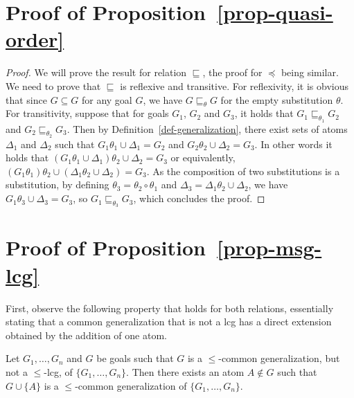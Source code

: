 
	\section{Proof of Proposition~\ref{prop-quasi-order}}
\begin{proof}
	We will prove the result for relation $\sqsubseteq$, the proof for $\preceq$ being similar. We need to prove that $\sqsubseteq$ is reflexive and transitive. For reflexivity, it is obvious that since $G\subseteq G$ for any goal $G$, we have $G\sqsubseteq_\theta G$ for the empty substitution $\theta$. For transitivity, suppose that for goals $G_1$, $G_2$ and $G_3$, it holds that $G_1 \sqsubseteq_{\theta_1} G_2$ and $G_2 \sqsubseteq_{\theta_2} G_3$. Then by Definition~\ref{def-generalization}, there exist sets of atoms $\Delta_1$ and $\Delta_2$ such that $G_1\theta_1 \cup \Delta_1 = G_2$ and $G_2\theta_2\cup\Delta_2 = G_3$. In other words it holds that $(G_1\theta_1\cup\Delta_1)\theta_2\cup\Delta_2 = G_3$ or equivalently, $(G_1\theta_1)\theta_2 \cup (\Delta_1\theta_2 \cup\Delta_2) = G_3$. As the composition of two substitutions is a substitution, by defining $\theta_3 = \theta_2\circ\theta_1$ and $\Delta_3 = \Delta_1\theta_2 \cup\Delta_2$, we have $G_1\theta_3 \cup \Delta_3 = G_3$, so $G_1\sqsubseteq_{\theta_3} G_3$, which concludes the proof.
\end{proof}
	

	\section{Proof of Proposition~\ref{prop-msg-lcg}}
	
		First, observe the following property that holds for both relations, essentially stating that a common generalization that is not a lcg has a direct extension obtained by the addition of one atom. 
		
		\begin{proposition}\label{prop-lcg-extensible}
			Let $G_1, \dots, G_n$ and $G$ be goals such that $G$ is a $\leqslant$-common generalization, but not a $\leqslant$-lcg, of $\{G_1, \dots, G_n\}$. Then there exists an atom $A\notin G$ such that $G\cup\{A\}$ is a $\leqslant$-common generalization of $\{G_1, \dots, G_n\}$.
		\end{proposition} 
	
